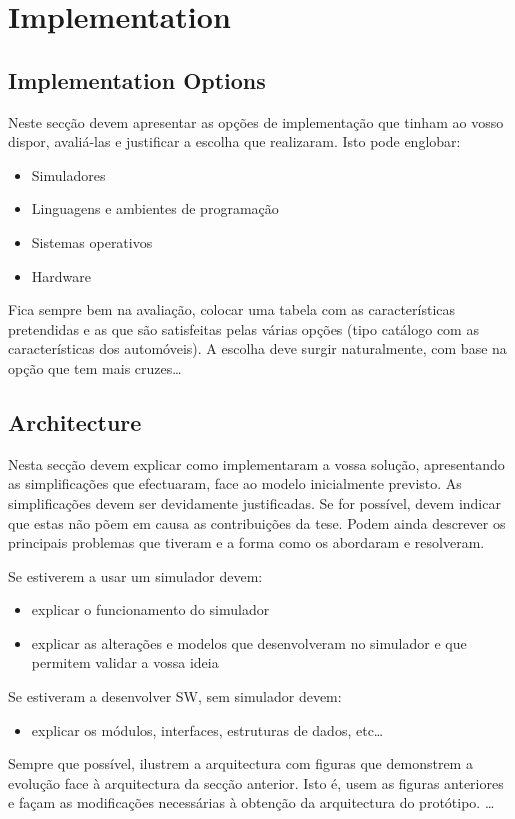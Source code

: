 \chapter{Implementation}\label{implementation}
\section{Implementation Options}
Neste secção devem apresentar as opções de implementação que tinham ao vosso
dispor, avaliá-las e justificar a escolha que realizaram. Isto pode englobar:
\begin{itemize}
    \item Simuladores
    \item Linguagens e ambientes de programação
    \item Sistemas operativos
    \item Hardware
\end{itemize}
Fica sempre bem na avaliação, colocar uma tabela com as características
pretendidas e as que são satisfeitas pelas várias opções (tipo catálogo com as
características dos automóveis). A escolha deve surgir naturalmente, com base na
opção que tem mais cruzes\ldots

\section{Architecture}
Nesta secção devem explicar como implementaram a vossa solução, apresentando
as simplificações que efectuaram, face ao modelo inicialmente previsto. As
simplificações devem ser devidamente justificadas. Se for possível, devem indicar
que estas não põem em causa as contribuições da tese.
Podem ainda descrever os principais problemas que tiveram e a forma como os
abordaram e resolveram.

Se estiverem a usar um simulador devem:

\begin{itemize}
    \item explicar o funcionamento do simulador
    \item explicar as alterações e modelos que desenvolveram no simulador e que permitem validar a vossa ideia 
\end{itemize}

Se estiveram a desenvolver SW, sem simulador devem:
\begin{itemize}
    \item explicar os módulos, interfaces, estruturas de dados, etc\ldots
\end{itemize}

Sempre que possível, ilustrem a arquitectura com figuras que demonstrem a
evolução face à arquitectura da secção anterior. Isto é, usem as figuras anteriores
e façam as modificações necessárias à obtenção da arquitectura do protótipo.
\ldots
